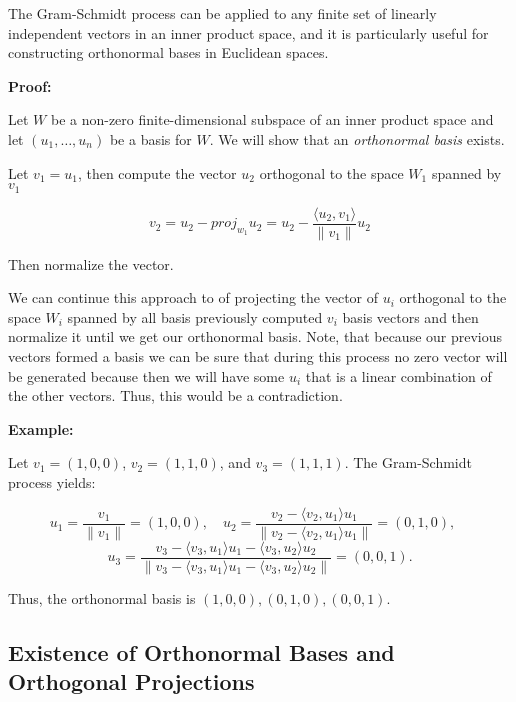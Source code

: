 The Gram-Schmidt process can be applied to any finite set of linearly independent vectors in an inner 
product space, and it is particularly useful for constructing orthonormal bases in Euclidean spaces.
\vspace{\baselineskip}

\textbf{Proof:}

Let \(W\) be a non-zero finite-dimensional subspace of an inner product space and let 
\((u_1, \dots, u_n)\) be a basis for \(W\). We will show that an \emph{orthonormal basis} exists.
\vspace{\baselineskip}

Let \(v_1 = u_1\), then compute the vector \(u_2\) orthogonal to the space \(W_1\) spanned by \(v_1\)

\[
    v_2 = u_2 - proj_{w_1} u_2 = u_2 - \frac{\langle u_2, v_1\rangle}{\|v_1\|} u_2
\]

Then normalize the vector.
\vspace{\baselineskip}

We can continue this approach to of projecting the vector of \(u_i\) orthogonal to the space \(W_i\) 
spanned by all basis previously computed \(v_i\) basis vectors and then normalize it 
until we get our orthonormal basis. Note, that because our previous vectors formed a basis we can be 
sure that during this process no zero vector will be generated because then we will have 
some \(u_i\) that is a linear combination of the other vectors. Thus, this would be a contradiction.

\QED
\vspace{\baselineskip}

\textbf{Example:}
\vspace{\baselineskip}
 
Let \( v_1 = (1, 0, 0) \), \( v_2 = (1, 1, 0) \), and \( v_3 = (1, 1, 1) \). The Gram-Schmidt process 
yields:

\[
    u_1 = \frac{v_1}{\|v_1\|} = (1, 0, 0), \quad
    u_2 = \frac{v_2 - \langle v_2, u_1 \rangle u_1}{\|v_2 - \langle v_2, u_1 \rangle u_1\|} = 
    \left(0, 1, 0\right), \quad
\]
\[
    u_3 = \frac{v_3 - \langle v_3, u_1 \rangle u_1 - \langle v_3, u_2 \rangle u_2}{\|v_3 - \langle v_3, u_1 \rangle u_1 - \langle v_3, u_2 \rangle u_2\|} = \left(0, 0, 1\right).
\]

Thus, the orthonormal basis is \( (1, 0, 0), (0, 1, 0), (0, 0, 1) \).

\subsection{Existence of Orthonormal Bases and Orthogonal Projections}

